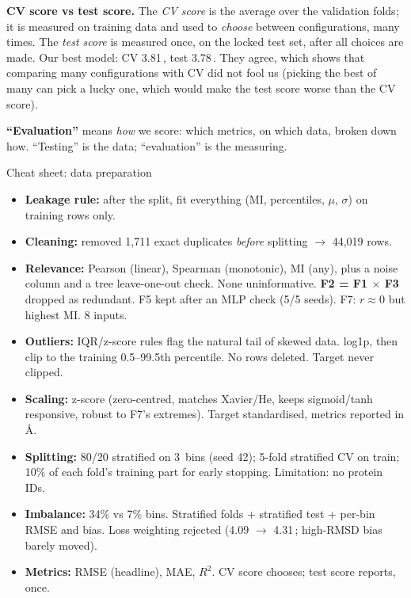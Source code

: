 \documentclass[11pt,a4paper]{article}
\newcommand{\A}{\,\text{\AA}}
\begin{document}
\textbf{CV score vs test score.} The \emph{CV score} is the average over the validation folds; it is measured on training
data and used to \emph{choose} between configurations, many times. The \emph{test score} is measured once, on the locked
test set, after all choices are made. Our best model: CV 3.81\A, test 3.78\A. They agree, which shows that comparing
many configurations with CV did not fool us (picking the best of many can pick a lucky one, which would make the test
score worse than the CV score).

\textbf{``Evaluation''} means \emph{how} we score: which metrics, on which data, broken down how. ``Testing'' is the data;
``evaluation'' is the measuring.

\begin{cheat}{Cheat sheet: data preparation}
\begin{itemize}
  \item \textbf{Leakage rule:} after the split, fit everything (MI, percentiles, $\mu$, $\sigma$) on training rows only.
  \item \textbf{Cleaning:} removed 1{,}711 exact duplicates \emph{before} splitting $\to$ 44{,}019 rows.
  \item \textbf{Relevance:} Pearson (linear), Spearman (monotonic), MI (any), plus a noise column and a tree
        leave-one-out check. None uninformative. \textbf{F2 = F1 $\times$ F3} dropped as redundant. F5 kept after an MLP check
        (5/5 seeds). F7: $r \approx 0$ but highest MI. 8 inputs.
  \item \textbf{Outliers:} IQR/z-score rules flag the natural tail of skewed data. log1p, then clip to the training
        0.5--99.5th percentile. No rows deleted. Target never clipped.
  \item \textbf{Scaling:} z-score (zero-centred, matches Xavier/He, keeps sigmoid/tanh responsive, robust to F7's extremes).
        Target standardised, metrics reported in \AA.
  \item \textbf{Splitting:} 80/20 stratified on 3\A{} bins (seed 42); 5-fold stratified CV on train; 10\% of each fold's
        training part for early stopping. Limitation: no protein IDs.
  \item \textbf{Imbalance:} 34\% vs 7\% bins. Stratified folds + stratified test + per-bin RMSE and bias. Loss weighting
        rejected (4.09 $\to$ 4.31\A; high-RMSD bias barely moved).
  \item \textbf{Metrics:} RMSE (headline), MAE, $R^2$. CV score chooses; test score reports, once.
\end{itemize}
\end{cheat}
\end{document}
